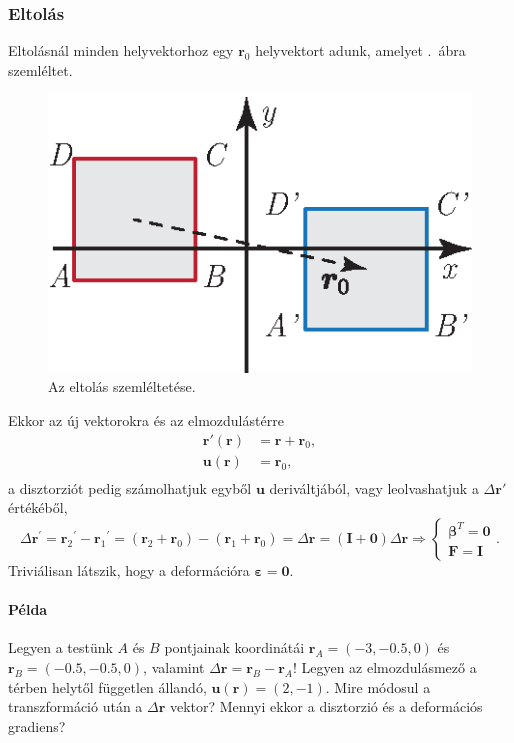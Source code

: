 \documentclass[12pt,a4paper]{scrartcl}
\let\mathbf\bm
\begin{document}
\subsubsection{Eltolás}
Eltolásnál minden helyvektorhoz egy ${{\mathbf{r}}_0}$ helyvektort adunk, amelyet \az{\ref{fig:eltolas}}.\ ábra szemléltet. 
\begin{figure}[htb] 
\centering    
\includegraphics[scale=1]{figs/eltolas.eps}
\caption{Az eltolás szemléltetése.}
\label{fig:eltolas}
\end{figure}
\FloatBarrier
Ekkor az új vektorokra és az elmozdulástérre
\[\begin{aligned}
  {\mathbf{r}}'\left( {\mathbf{r}} \right) &  = {\mathbf{r}} + {{\mathbf{r}}_0}, \\ 
  {\mathbf{u}}\left( {\mathbf{r}} \right) &  = {{\mathbf{r}}_0}, \\ 
\end{aligned} \]
a disztorziót pedig számolhatjuk egyből ${\mathbf{u}}$ deriváltjából, vagy leolvashatjuk a $\Delta {\mathbf{r}}'$ értékéből,
\[\Delta {{\mathbf{r}}^\prime } = {{\mathbf{r}}_2}^\prime  - {{\mathbf{r}}_1}^\prime  = \left( {{{\mathbf{r}}_2} + {{\mathbf{r}}_0}} \right) - \left( {{{\mathbf{r}}_1} + {{\mathbf{r}}_0}} \right) = \Delta {\mathbf{r}} = \left( {{\mathbf{I}} + {\mathbf{0}}} \right)\Delta {\mathbf{r}} \Rightarrow \left\{ {\begin{array}{*{20}{c}}
  {{{\mathbf{\beta }}^T} = {\mathbf{0}}} \\ 
  {{\mathbf{F}} = {\mathbf{I}}} 
\end{array}} \right..\]
Triviálisan látszik, hogy a deformációra ${\mathbf{\varepsilon}} = {\mathbf{0}}$.

\footnotesize
\paragraph{Példa}
Legyen a testünk $A$ és $B$ pontjainak koordinátái ${{\mathbf{r}}_A} = \left( { - 3, - 0.5, 0} \right)$ és ${{\mathbf{r}}_B} = \left( { - 0.5, - 0.5, 0} \right)$, valamint $\Delta {\mathbf{r}} = {{\mathbf{r}}_B} - {{\mathbf{r}}_A}$! Legyen az elmozdulásmező a térben helytől független állandó, ${\mathbf{u}}\left( {\mathbf{r}} \right) = \left( {2, - 1} \right)$. 
Mire módosul a transzformáció után a $\Delta {\mathbf{r}}$ vektor? Mennyi ekkor a disztorzió és a deformációs gradiens?
\end{document}
